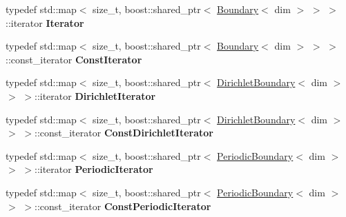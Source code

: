\begin{DoxyCompactItemize}
\item 
\hypertarget{classnatrium_1_1BoundaryCollection_a48a9256fb603f1bc4b7e04b6feef0feb}{
typedef std::map$<$ size\_\-t, boost::shared\_\-ptr$<$ \hyperlink{classnatrium_1_1Boundary}{Boundary}$<$ dim $>$ $>$ $>$::iterator {\bfseries Iterator}}
\label{classnatrium_1_1BoundaryCollection_a48a9256fb603f1bc4b7e04b6feef0feb}

\item 
\hypertarget{classnatrium_1_1BoundaryCollection_ad617c979f5d65a32f669276fa18702da}{
typedef std::map$<$ size\_\-t, boost::shared\_\-ptr$<$ \hyperlink{classnatrium_1_1Boundary}{Boundary}$<$ dim $>$ $>$ $>$::const\_\-iterator {\bfseries ConstIterator}}
\label{classnatrium_1_1BoundaryCollection_ad617c979f5d65a32f669276fa18702da}

\item 
\hypertarget{classnatrium_1_1BoundaryCollection_a8fdcb7638e2ea212f1a6ed598b724ec9}{
typedef std::map$<$ size\_\-t, boost::shared\_\-ptr$<$ \hyperlink{classnatrium_1_1DirichletBoundary}{DirichletBoundary}$<$ dim $>$ $>$ $>$::iterator {\bfseries DirichletIterator}}
\label{classnatrium_1_1BoundaryCollection_a8fdcb7638e2ea212f1a6ed598b724ec9}

\item 
\hypertarget{classnatrium_1_1BoundaryCollection_a4af3b3df374b2da399df9dbcf43d6752}{
typedef std::map$<$ size\_\-t, boost::shared\_\-ptr$<$ \hyperlink{classnatrium_1_1DirichletBoundary}{DirichletBoundary}$<$ dim $>$ $>$ $>$::const\_\-iterator {\bfseries ConstDirichletIterator}}
\label{classnatrium_1_1BoundaryCollection_a4af3b3df374b2da399df9dbcf43d6752}

\item 
\hypertarget{classnatrium_1_1BoundaryCollection_a9c641c34778fdb95ff98827c818773e6}{
typedef std::map$<$ size\_\-t, boost::shared\_\-ptr$<$ \hyperlink{classnatrium_1_1PeriodicBoundary}{PeriodicBoundary}$<$ dim $>$ $>$ $>$::iterator {\bfseries PeriodicIterator}}
\label{classnatrium_1_1BoundaryCollection_a9c641c34778fdb95ff98827c818773e6}

\item 
\hypertarget{classnatrium_1_1BoundaryCollection_aa3e1ff6ad230abd5fb3cedc303e00678}{
typedef std::map$<$ size\_\-t, boost::shared\_\-ptr$<$ \hyperlink{classnatrium_1_1PeriodicBoundary}{PeriodicBoundary}$<$ dim $>$ $>$ $>$::const\_\-iterator {\bfseries ConstPeriodicIterator}}
\label{classnatrium_1_1BoundaryCollection_aa3e1ff6ad230abd5fb3cedc303e00678}

\end{DoxyCompactItemize}

